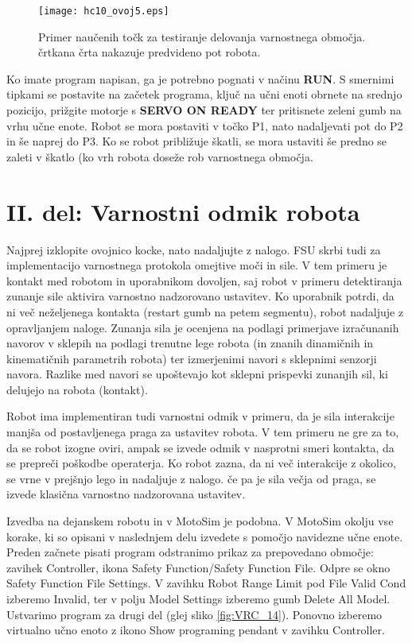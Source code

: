 \begin{figure}[!hbt]
	\centering
	\texttt{[image: hc10\_ovoj5.eps]}
	\caption{Primer naučenih točk za testiranje delovanja varnostnega območja. črtkana črta nakazuje predvideno pot robota.}
	\label{fig:hc10_ovoj5}
\end{figure}

Ko imate program napisan, ga je potrebno pognati v načinu \textbf{RUN}. S smernimi tipkami se postavite na začetek programa, ključ na učni enoti obrnete na srednjo pozicijo, prižgite motorje s \textbf{SERVO ON READY} ter pritisnete zeleni gumb na vrhu učne enote. Robot se mora postaviti v točko P1, nato nadaljevati pot do P2 in še naprej do P3. Ko se robot približuje škatli, se mora ustaviti še predno se zaleti v škatlo (ko vrh robota doseže rob varnostnega območja.

\section{II. del: Varnostni odmik robota}

Najprej izklopite ovojnico kocke, nato nadaljujte z nalogo. FSU skrbi tudi za implementacijo varnostnega protokola omejtive moči in sile. V tem primeru je kontakt med robotom in uporabnikom dovoljen, saj robot v primeru detektiranja zunanje sile aktivira varnostno nadzorovano ustavitev. Ko uporabnik potrdi, da ni več neželjenega kontakta (restart gumb na petem segmentu), robot nadaljuje z opravljanjem naloge. Zunanja sila je ocenjena na podlagi primerjave izračunanih navorov v sklepih na podlagi trenutne lege robota (in znanih dinamičnih in kinematičnih parametrih robota) ter izmerjenimi navori s sklepnimi senzorji  navora. Razlike med navori se upoštevajo kot sklepni prispevki zunanjih sil, ki delujejo na robota (kontakt).

Robot ima implementiran tudi varnostni odmik v primeru, da je sila interakcije manjša od postavljenega praga za ustavitev robota. V tem primeru ne gre za to, da se robot izogne oviri, ampak se izvede odmik v nasprotni smeri kontakta, da se prepreči poškodbe operaterja. Ko robot zazna, da ni več interakcije z okolico, se vrne v prejšnjo lego in nadaljuje z nalogo. če pa je sila večja od praga, se izvede klasična varnostno nadzorovana ustavitev.

Izvedba na dejanskem robotu in v MotoSim je podobna. V MotoSim okolju vse korake, ki so opisani v naslednjem delu izvedete s pomočjo navidezne učne enote. Preden začnete pisati program odstranimo prikaz za prepovedano območje: zavihek Controller, ikona Safety Function/Safety Function File. Odpre se okno Safety Function File Settings. V zavihku Robot Range Limit pod File Valid Cond izberemo Invalid, ter v polju Model Settings izberemo gumb Delete All Model.
Ustvarimo program za drugi del (glej sliko \ref{fig:VRC_14}). Ponovno izberemo virtualno učno enoto z ikono Show programing pendant v zavihku Controller. 

